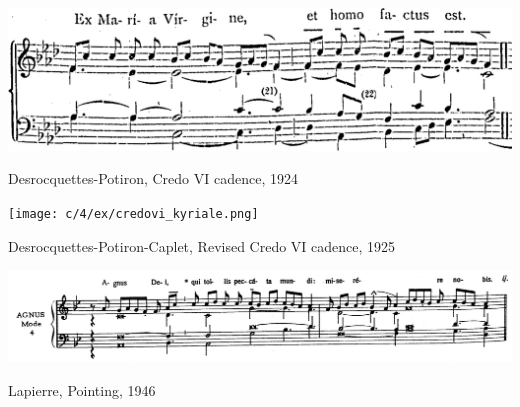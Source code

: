 \vspace*{\fill}

\newpage

\vspace*{\fill}

\begin{example}
  \centering
  \includegraphics[width=\linewidth]{c/4/ex/credovi_rev.png}
  \caption{Desrocquettes-Potiron, Credo VI cadence, 1924}
  \label{mus:credovi_revue}
\end{example}

\vspace*{\fill}

\begin{example}
  \centering
  \texttt{[image: c/4/ex/credovi\_kyriale.png]}
  \caption{Desrocquettes-Potiron-Caplet, Revised Credo VI cadence, 1925}
  \label{mus:credovi_kyriale}
\end{example}

\vspace*{\fill}

\begin{landscape}

\vspace*{\fill}


\begin{example}
  \centering
  \includegraphics[width=.9\linewidth]{c/4/ex/lapierre_punctuation.png}
  \caption{Lapierre, Pointing, 1946}
  \label{mus:lapierre_punctuation}
\end{example}

\vspace*{\fill}

\end{landscape}

